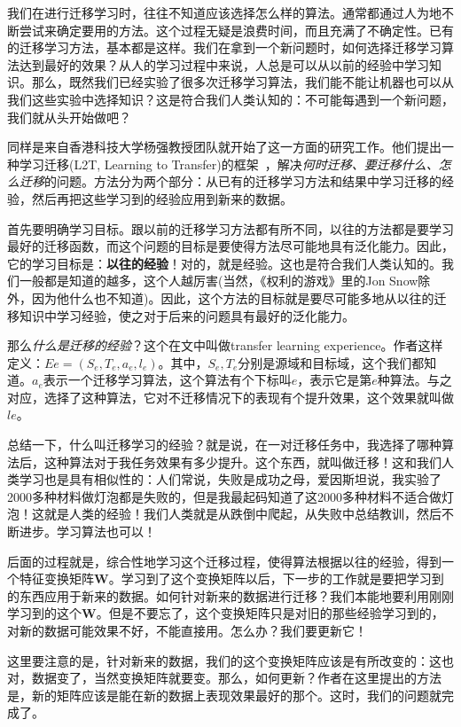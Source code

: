 我们在进行迁移学习时，往往不知道应该选择怎么样的算法。通常都通过人为地不断尝试来确定要用的方法。这个过程无疑是浪费时间，而且充满了不确定性。已有的迁移学习方法，基本都是这样。我们在拿到一个新问题时，如何选择迁移学习算法达到最好的效果？从人的学习过程中来说，人总是可以从以前的经验中学习知识。那么，既然我们已经实验了很多次迁移学习算法，我们能不能让机器也可以从我们这些实验中选择知识？这是符合我们人类认知的：不可能每遇到一个新问题，我们就从头开始做吧？

同样是来自香港科技大学杨强教授团队就开始了这一方面的研究工作。他们提出一种学习迁移(L2T, Learning to Transfer)的框架~\cite{wei2017learning}，解决\textit{何时迁移、要迁移什么、怎么迁移}的问题。方法分为两个部分：从已有的迁移学习方法和结果中学习迁移的经验，然后再把这些学习到的经验应用到新来的数据。

首先要明确学习目标。跟以前的迁移学习方法都有所不同，以往的方法都是要学习最好的迁移函数，而这个问题的目标是要使得方法尽可能地具有泛化能力。因此，它的学习目标是：\textbf{以往的经验}！对的，就是经验。这也是符合我们人类认知的。我们一般都是知道的越多，这个人越厉害(当然，《权利的游戏》里的Jon Snow除外，因为他什么也不知道)。因此，这个方法的目标就是要尽可能多地从以往的迁移知识中学习经验，使之对于后来的问题具有最好的泛化能力。 

那么\textit{什么是迁移的经验}？这个在文中叫做transfer learning experience。作者这样定义：$Ee=(S_e,T_e,a_e,l_e)$。其中，$S_e,T_e$分别是源域和目标域，这个我们都知道。$a_e$表示一个迁移学习算法，这个算法有个下标叫$e$，表示它是第$e$种算法。与之对应，选择了这种算法，它对不迁移情况下的表现有个提升效果，这个效果就叫做$le$。

总结一下，什么叫迁移学习的经验？就是说，在一对迁移任务中，我选择了哪种算法后，这种算法对于我任务效果有多少提升。这个东西，就叫做迁移！这和我们人类学习也是具有相似性的：人们常说，失败是成功之母，爱因斯坦说，我实验了2000多种材料做灯泡都是失败的，但是我最起码知道了这2000多种材料不适合做灯泡！这就是人类的经验！我们人类就是从跌倒中爬起，从失败中总结教训，然后不断进步。学习算法也可以！ 

后面的过程就是，综合性地学习这个迁移过程，使得算法根据以往的经验，得到一个特征变换矩阵$\mathbf{W}$。学习到了这个变换矩阵以后，下一步的工作就是要把学习到的东西应用于新来的数据。如何针对新来的数据进行迁移？我们本能地要利用刚刚学习到的这个$\mathbf{W}$。但是不要忘了，这个变换矩阵只是对旧的那些经验学习到的，对新的数据可能效果不好，不能直接用。怎么办？我们要更新它！

这里要注意的是，针对新来的数据，我们的这个变换矩阵应该是有所改变的：这也对，数据变了，当然变换矩阵就要变。那么，如何更新？作者在这里提出的方法是，新的矩阵应该是能在新的数据上表现效果最好的那个。这时，我们的问题就完成了。 

